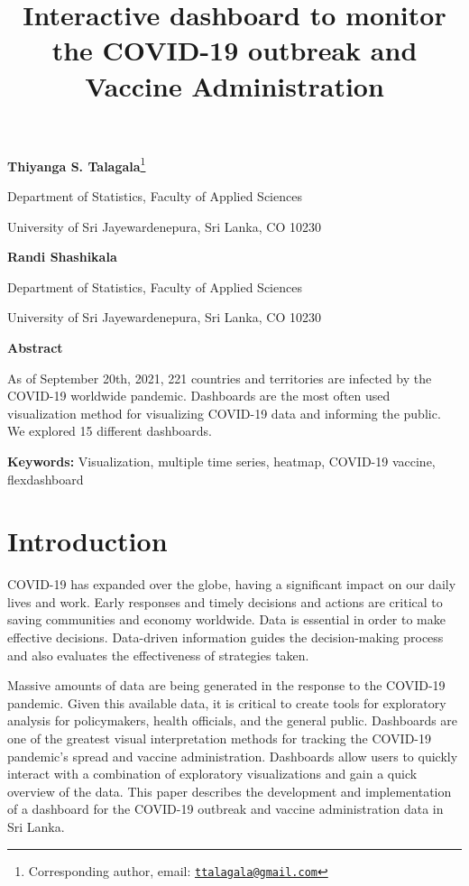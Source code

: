\documentclass[
]{article}
\title{Interactive dashboard to monitor the COVID-19 outbreak and
Vaccine Administration}
\author{}
\date{\vspace{-2.5em}}
\begin{document}
\maketitle

\textbf{Thiyanga S. Talagala}\footnote{Corresponding author, email:
  \href{mailto:ttalagala@gmail.com}{\nolinkurl{ttalagala@gmail.com}}}

Department of Statistics, Faculty of Applied Sciences

University of Sri Jayewardenepura, Sri Lanka, CO 10230

\hspace{3cm}

\textbf{Randi Shashikala}

Department of Statistics, Faculty of Applied Sciences

University of Sri Jayewardenepura, Sri Lanka, CO 10230

\hspace{3cm}

\textbf{Abstract}

As of September 20th, 2021, 221 countries and territories are infected
by the COVID-19 worldwide pandemic. Dashboards are the most often used
visualization method for visualizing COVID-19 data and informing the
public. We explored 15 different dashboards.

\textbf{Keywords:} Visualization, multiple time series, heatmap,
COVID-19 vaccine, flexdashboard

\hypertarget{introduction}{%
\section{Introduction}\label{introduction}}

COVID-19 has expanded over the globe, having a significant impact on our
daily lives and work. Early responses and timely decisions and actions
are critical to saving communities and economy worldwide. Data is
essential in order to make effective decisions. Data-driven information
guides the decision-making process and also evaluates the effectiveness
of strategies taken.

Massive amounts of data are being generated in the response to the
COVID-19 pandemic. Given this available data, it is critical to create
tools for exploratory analysis for policymakers, health officials, and
the general public. Dashboards are one of the greatest visual
interpretation methods for tracking the COVID-19 pandemic's spread and
vaccine administration. Dashboards allow users to quickly interact with
a combination of exploratory visualizations and gain a quick overview of
the data. This paper describes the development and implementation of a
dashboard for the COVID-19 outbreak and vaccine administration data in
Sri Lanka.
\end{document}
